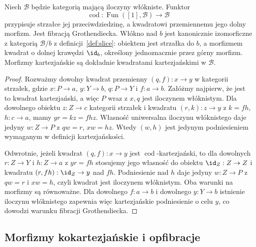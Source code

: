 \begin{przyklad}\label{cat:ex:codomain-fibration}
Niech $\mathcal B$ będzie kategorią mającą iloczyny włókniste. Funktor
\[
 \operatorname{cod}:\operatorname{Fun}([1],\mathcal B)\longrightarrow\mathcal B
\]
przypisuje strzałce jej przeciwdziedzinę, a kwadratowi przemiennemu jego dolny morfizm. Jest fibracją Grothendiecka. Włókno nad $b$ jest kanonicznie izomorficzne z kategorią $\mathcal B/b$ z definicji~\ref{def:slice}: obiektem jest strzałka do $b$, a morfizmem kwadrat o dolnej krawędzi $\id_b$, określony jednoznacznie przez górny morfizm. Morfizmy kartezjańskie są dokładnie kwadratami kartezjańskimi w $\mathcal B$.
\end{przyklad}
\begin{proof}
Rozważmy dowolny kwadrat przemienny $(q,f):x\to y$ w kategorii strzałek, gdzie $x:P\to a$, $y:Y\to b$, $q:P\to Y$ i $f:a\to b$. Załóżmy najpierw, że jest to kwadrat kartezjański, a więc $P$ wraz z $x,q$ jest iloczynem włóknistym. Dla dowolnego obiektu $z:Z\to c$ kategorii strzałek i kwadratu $(r,k):z\to y$ z $k=fh$, $h:c\to a$, mamy $yr=kz=fhz$. Własność uniwersalna iloczynu włóknistego daje jedyny $w:Z\to P$ z $qw=r$, $xw=hz$. Wtedy $(w,h)$ jest jedynym podniesieniem wymaganym w definicji kartezjańskości.

Odwrotnie, jeżeli kwadrat $(q,f):x\to y$ jest $\operatorname{cod}$-kartezjański, to dla dowolnych $r:Z\to Y$ i $h:Z\to a$ z $yr=fh$ stosujemy jego własność do obiektu $\id_Z:Z\to Z$ i kwadratu $(r,fh):\id_Z\to y$ nad $fh$. Podniesienie nad $h$ daje jedyny $w:Z\to P$ z $qw=r$ i $xw=h$, czyli kwadrat jest iloczynem włóknistym. Oba warunki na morfizmy są równoważne. Dla dowolnego $f:a\to b$ i dowolnego $y:Y\to b$ istnienie iloczynu włóknistego zapewnia więc kartezjańskie podniesienie o celu $y$, co dowodzi warunku fibracji Grothendiecka.
\end{proof}

\begin{center}
\end{center}

\subsection{Morfizmy kokartezjańskie i opfibracje}

